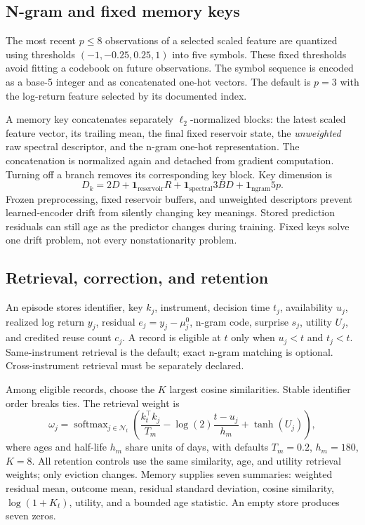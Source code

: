 \documentclass[11pt,a4paper]{article}
\newcommand{\ind}{\mathbf 1}
\begin{document}
\subsection{N-gram and fixed memory keys}

The most recent $p\le8$ observations of a selected scaled feature are quantized using thresholds $(-1,-0.25,0.25,1)$ into five symbols. These fixed thresholds avoid fitting a codebook on future observations. The symbol sequence is encoded as a base-5 integer and as concatenated one-hot vectors. The default is $p=3$ with the log-return feature selected by its documented index.

A memory key concatenates separately $\ell_2$-normalized blocks: the latest scaled feature vector, its trailing mean, the final fixed reservoir state, the \emph{unweighted} raw spectral descriptor, and the n-gram one-hot representation. The concatenation is normalized again and detached from gradient computation. Turning off a branch removes its corresponding key block. Key dimension is
\begin{equation}
D_k=2D+\ind_{\mathrm{reservoir}}R+\ind_{\mathrm{spectral}}3BD+\ind_{\mathrm{ngram}}5p.
\end{equation}
Frozen preprocessing, fixed reservoir buffers, and unweighted descriptors prevent learned-encoder drift from silently changing key meanings. Stored prediction residuals can still age as the predictor changes during training. Fixed keys solve one drift problem, not every nonstationarity problem.

\subsection{Retrieval, correction, and retention}

An episode stores identifier, key $k_j$, instrument, decision time $t_j$, availability $u_j$, realized log return $y_j$, residual $e_j=y_j-\mu^0_j$, n-gram code, surprise $s_j$, utility $U_j$, and credited reuse count $c_j$. A record is eligible at $t$ only when $u_j<t$ and $t_j<t$. Same-instrument retrieval is the default; exact n-gram matching is optional. Cross-instrument retrieval must be separately declared.

Among eligible records, choose the $K$ largest cosine similarities. Stable identifier order breaks ties. The retrieval weight is
\begin{equation}
\omega_j=\operatorname{softmax}_{j\in\mathcal N_t}\left(\frac{k_t^\top k_j}{T_m}-\log(2)\frac{t-u_j}{h_m}+\tanh(U_j)\right),
\end{equation}
where ages and half-life $h_m$ share units of days, with defaults $T_m=0.2$, $h_m=180$, $K=8$. All retention controls use the same similarity, age, and utility retrieval weights; only eviction changes. Memory supplies seven summaries: weighted residual mean, outcome mean, residual standard deviation, cosine similarity, $\log(1+K_t)$, utility, and a bounded age statistic. An empty store produces seven zeros.
\end{document}
